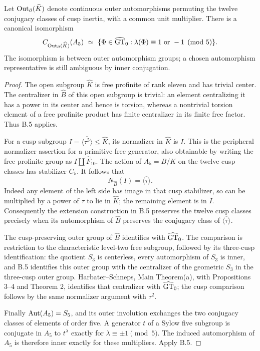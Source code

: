 Let \(\operatorname{Out}_{\partial}(\widehat K)\) denote continuous outer
automorphisms permuting the twelve conjugacy classes of cusp inertia,
with a common unit multiplier. There is a canonical isomorphism
\[
 C_{\operatorname{Out}_{\partial}(\widehat K)}(A_5)
 \ \simeq\
 \{\Phi\in\widehat{\mathrm{GT}}_0:\lambda(\Phi)\equiv1\text{ or }-1\pmod5\}.
\]
The isomorphism is between outer automorphism groups; a chosen
automorphism representative is still ambiguous by inner conjugation.
\begin{proof}
The open subgroup \(\widehat K\) is free profinite of rank eleven and
has trivial center. The centralizer in \(\widehat B\) of this open
subgroup is trivial: an element centralizing it has a power in its
center and hence is torsion, whereas a nontrivial torsion element
of a free profinite product has finite centralizer in its finite
free factor. Thus B.5 applies.

For a cusp subgroup \(I=\overline{\langle\tau^5\rangle}\leq\widehat K\),
its normalizer in \(\widehat K\) is \(I\). This is the
peripheral normalizer assertion for a primitive free generator,
also obtainable by writing the free profinite group as
\(I\amalg\widehat F_{10}\). The action of
\(A_5=B/K\) on the twelve cusp classes has stabilizer \(C_5\).
It follows that
\[
 N_{\widehat B}(I)=\overline{\langle\tau\rangle}.
\]
Indeed any element of the left side has image in that cusp
stabilizer, so can be multiplied by a power of \(\tau\) to lie
in \(\widehat K\); the remaining element is in \(I\).
Consequently the extension construction in B.5 preserves the
twelve cusp classes precisely when its automorphism of
\(\widehat B\) preserves the conjugacy class of
\(\overline{\langle\tau\rangle}\).

The cusp-preserving outer group of \(\widehat B\) identifies with
\(\widehat{\mathrm{GT}}_0\). The comparison is restriction to the characteristic
level-two free subgroup, followed by its three-cusp identification:
the quotient \(S_3\) is centerless, every automorphism of \(S_3\) is
inner, and B.5 identifies this outer group with the centralizer of
the geometric \(S_3\) in the three-cusp outer group.
Harbater--Schneps, Main Theorem(a), with Propositions 3--4 and
Theorem 2, identifies that centralizer with \(\widehat{\mathrm{GT}}_0\);
the cusp comparison follows by the same normalizer argument with
\(\tau^2\).

Finally \(\operatorname{Aut}(A_5)=S_5\), and its outer involution exchanges the
two conjugacy classes of elements of order five. A generator \(t\)
of a Sylow five subgroup is conjugate in \(A_5\) to \(t^\lambda\)
exactly for \(\lambda\equiv\pm1\pmod5\).
The induced automorphism of \(A_5\) is therefore inner exactly for
these multipliers. Apply B.5.
\end{proof}

